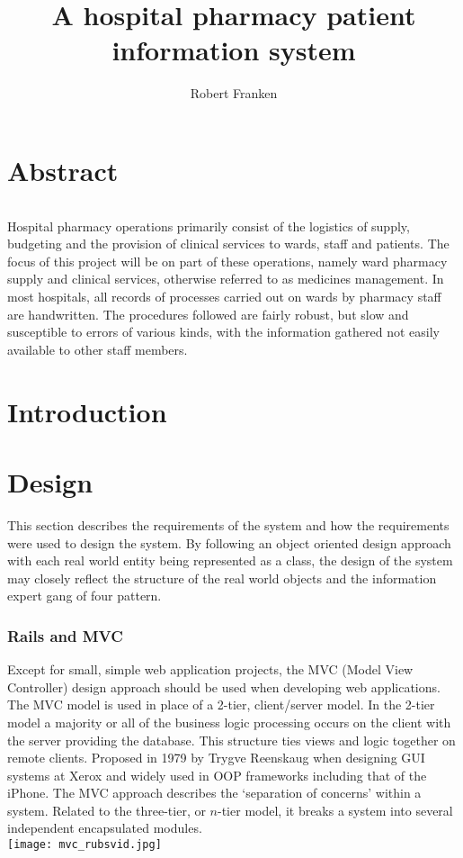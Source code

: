 \documentclass[letterpaper]{amsart}
\author{Robert Franken}
\title{A hospital pharmacy patient information system}
\begin{document}
\maketitle
\part{Abstract}
\paragraph{} Hospital pharmacy operations primarily consist of the logistics of supply, budgeting and the provision of clinical services to wards, staff and patients. 
The focus of this project will be on part of these operations, namely ward pharmacy supply and clinical services, otherwise referred to as medicines management. In most hospitals, all records of processes carried out on wards by pharmacy staff are handwritten. The procedures followed are fairly robust, but slow and susceptible to errors of various kinds, with the information gathered not easily available to other staff members.
\part{Introduction}

\part{Design}
This section describes the requirements of the system and how the requirements were used to design the system. By following an object oriented design approach with each real world entity being represented as a class, the design of the system may closely reflect the structure of the real world objects and the information expert gang of four pattern.
\section{Rails and MVC}
Except for small, simple web application projects, the MVC (Model View Controller) design approach should be used when developing web applications.\cite{tomcat}  The MVC model is used in place of a 2-tier, client/server model.  In the 2-tier model a majority or all of the business logic processing occurs on the client with the server providing the database.  This structure ties views and logic together on remote clients.  
Proposed in 1979 by Trygve Reenskaug when designing GUI systems at Xerox and widely used in OOP frameworks including that of the iPhone\cite{iphoneaction}. The MVC approach describes the `separation of concerns' within a system.  Related to the three-tier, or $n$-tier model, it breaks a system into several independent encapsulated modules\cite{rubesvid}.
\\\texttt{[image: mvc\_rubsvid.jpg]}
\end{document}
